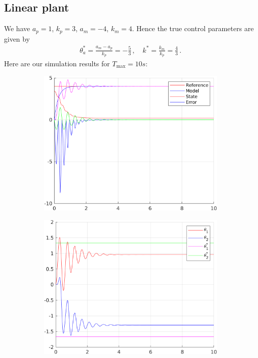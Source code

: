 \documentclass[12pt,a4paper]{article}
\begin{document}
	\subsection*{Linear plant}
	
	We have $a_p = 1$, $k_p = 3$, $a_m = -4$, $k_m = 4$. 
	Hence the true control parameters are given by 
	\begin{align*}
		\theta_a^* = \frac{a_m-a_p}{k_p} = -\frac{5}{3}\,, \quad 
		k^* = \frac{k_m}{k_p} = \frac{4}{3}\,.
	\end{align*}
	Here are our simulation results for $T_{\text{max}} = 10s$:

		\begin{figure}[H]
			\centering
			\begin{subfigure}{.45\textwidth}
				\centering
				\includegraphics[width=1\textwidth]{Graphics/LinearState1.png}
			\end{subfigure}%
			\begin{subfigure}{.45\textwidth}
				\centering
				\includegraphics[width=1\textwidth]{Graphics/LinearParameters1.png}

\end{subfigure}
\end{figure}
\end{document}
